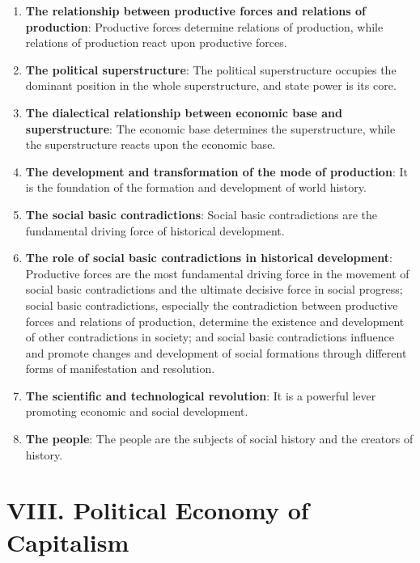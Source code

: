\documentclass[12pt,a4paper]{ctexart}
\begin{document}
\begin{enumerate}[leftmargin=2em]
    \item \textbf{The relationship between productive forces and relations of production}: Productive forces determine relations of production, while relations of production react upon productive forces.
    
    \item \textbf{The political superstructure}: The political superstructure occupies the dominant position in the whole superstructure, and state power is its core.
    
    \item \textbf{The dialectical relationship between economic base and superstructure}: The economic base determines the superstructure, while the superstructure reacts upon the economic base.
    
    \item \textbf{The development and transformation of the mode of production}: It is the foundation of the formation and development of world history.
    
    \item \textbf{The social basic contradictions}: Social basic contradictions are the fundamental driving force of historical development.
    
    \item \textbf{The role of social basic contradictions in historical development}: Productive forces are the most fundamental driving force in the movement of social basic contradictions and the ultimate decisive force in social progress; social basic contradictions, especially the contradiction between productive forces and relations of production, determine the existence and development of other contradictions in society; and social basic contradictions influence and promote changes and development of social formations through different forms of manifestation and resolution.
    
    \item \textbf{The scientific and technological revolution}: It is a powerful lever promoting economic and social development.
    
    \item \textbf{The people}: The people are the subjects of social history and the creators of history.
\end{enumerate}

\section{VIII. Political Economy of Capitalism}
\end{document}
